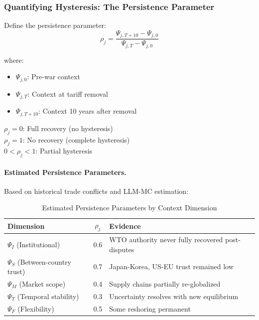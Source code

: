 \subsubsection{Quantifying Hysteresis: The Persistence Parameter}

Define the persistence parameter:
\begin{equation}
\rho_j = \frac{\Psi_{j,T+10} - \Psi_{j,0}}{\Psi_{j,T} - \Psi_{j,0}}
\end{equation}

where:
\begin{itemize}
    \item $\Psi_{j,0}$: Pre-war context
    \item $\Psi_{j,T}$: Context at tariff removal
    \item $\Psi_{j,T+10}$: Context 10 years after removal
\end{itemize}

$\rho_j = 0$: Full recovery (no hysteresis)\\
$\rho_j = 1$: No recovery (complete hysteresis)\\
$0 < \rho_j < 1$: Partial hysteresis

\paragraph{Estimated Persistence Parameters.}

Based on historical trade conflicts and LLM-MC estimation:

\begin{table}[htbp]
\centering
\caption{Estimated Persistence Parameters by Context Dimension}
\label{tab:persistence}
\begin{tabular}{@{}lcl@{}}
\toprule
\textbf{Dimension} & \textbf{$\rho_j$} & \textbf{Evidence} \\
\midrule
$\Psi_I$ (Institutional) & 0.6 & WTO authority never fully recovered post-disputes \\
$\Psi_S$ (Between-country trust) & 0.7 & Japan-Korea, US-EU trust remained low \\
$\Psi_M$ (Market scope) & 0.4 & Supply chains partially re-globalized \\
$\Psi_T$ (Temporal stability) & 0.3 & Uncertainty resolves with new equilibrium \\
$\Psi_F$ (Flexibility) & 0.5 & Some reshoring permanent \\
\bottomrule
\end{tabular}
\end{table}

